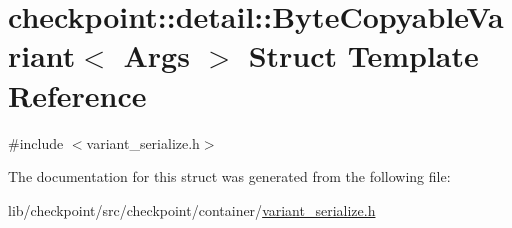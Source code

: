\hypertarget{structcheckpoint_1_1detail_1_1_byte_copyable_variant}{}\section{checkpoint\+:\+:detail\+:\+:Byte\+Copyable\+Variant$<$ Args $>$ Struct Template Reference}
\label{structcheckpoint_1_1detail_1_1_byte_copyable_variant}


{\ttfamily \#include $<$variant\+\_\+serialize.\+h$>$}



The documentation for this struct was generated from the following file\+:\begin{DoxyCompactItemize}
\item 
lib/checkpoint/src/checkpoint/container/\hyperlink{variant__serialize_8h}{variant\+\_\+serialize.\+h}\end{DoxyCompactItemize}
